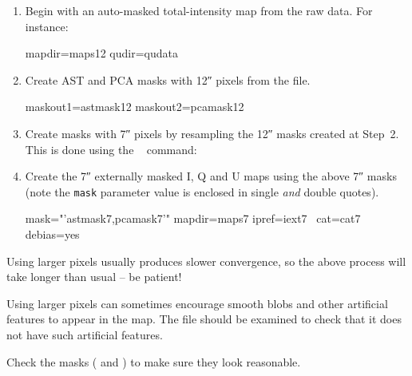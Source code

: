 \begin{enumerate}
\item Begin with an auto-masked total-intensity map from the raw
  data. For instance:

\begin{terminalv}
     mapdir=maps12 qudir=qudata
\end{terminalv}


\item Create AST and PCA masks with 12\si{\arcsecond} pixels from the
   file.


\begin{terminalv}
     maskout1=astmask12 maskout2=pcamask12
\end{terminalv}

\item Create masks with 7\si{\arcsecond} pixels by resampling the
  12\si{\arcsecond} masks created at Step~2. This is done using the
  \Kappa\  command:

\begin{terminalv}
\end{terminalv}

\item Create the 7\si{\arcsecond} externally masked I, Q and U maps
  using the above 7\si{\arcsecond} masks (note the \texttt{mask}
  parameter value is enclosed in single \emph{and} double quotes).

\begin{terminalv}
                  mask="'astmask7,pcamask7'" mapdir=maps7 ipref=iext7  \
                  cat=cat7 debias=yes
\end{terminalv}
\end{enumerate}

\begin{tip}
  Using larger pixels usually produces slower convergence, so the
  above process will take longer than usual -- be patient!

  Using larger pixels can sometimes encourage smooth blobs and other
  artificial features to appear in the map. The \file{iauto12.sdf} file
  should be examined to check that it does not have such artificial
  features.

  Check the masks ( and ) to make sure they
  look reasonable.
\end{tip}

